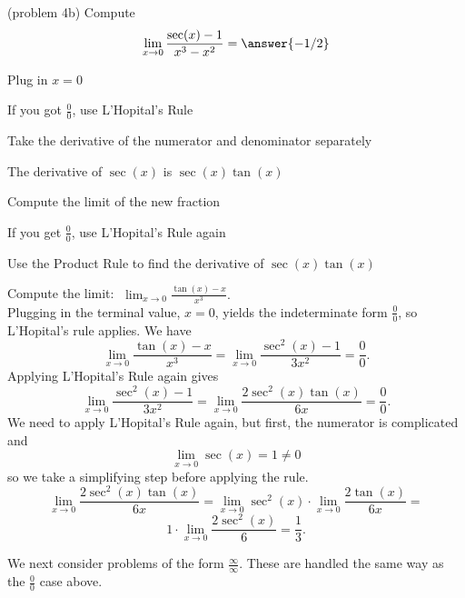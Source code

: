\documentclass[handout]{ximera}
\begin{document}
\begin{problem}(problem 4b)
  Compute
  \[
  \lim_{x \to 0} \frac{\sec(x) - 1}{x^3 - x^2} = \answer{-1/2}
  \]
  
    \begin{hint}
      Plug in $x=0$
    \end{hint}
    \begin{hint}
      If you got $\frac00$, use L'Hopital's Rule
    \end{hint}
    \begin{hint}
      Take the derivative of the numerator and denominator separately
    \end{hint}
		\begin{hint}
		  The derivative of $\sec(x)$ is $\sec(x)\tan(x)$
	  \end{hint}
		\begin{hint}
      Compute the limit of the new fraction
    \end{hint}
		\begin{hint}
		 If you get $\frac00$, use L'Hopital's Rule again
    \end{hint}
		\begin{hint}
		  Use the Product Rule to find the derivative of $\sec(x)\tan(x)$
		\end{hint}
		
\end{problem}


\begin{example}[example 5]
Compute the limit:  $\displaystyle{\;\lim_{x \to 0} \frac{\tan(x)-x}{x^3}}.$\\
Plugging in the terminal value, $x=0$, yields 
the indeterminate form $\frac00$, so L'Hopital's rule applies.
We have 
\[\lim_{x \to 0} \frac{\tan(x)-x}{x^3} = \lim_{x \to 0} \frac{\sec^2(x)-1}{3x^2} = \frac{0}{0}.\]
Applying L'Hopital's Rule again gives
\[\lim_{x \to 0} \frac{\sec^2(x)-1}{3x^2} = \lim_{x \to 0} \frac{2\sec^2(x)\tan(x)}{6x} = \frac{0}{0}.\]	
We need to apply L'Hopital's Rule again, but first, the numerator is complicated and 								
\[\lim_{x \to 0} \sec(x) = 1 \neq 0\]
so we take a simplifying step before applying the rule.
\[\lim_{x \to 0} \frac{2\sec^2(x)\tan(x)}{6x} = 
\lim_{x \to 0} \sec^2(x) \cdot \lim_{x \to 0} \frac{2\tan(x)}{6x}=\]
 \[1\cdot \lim_{x \to 0} \frac{2\sec^2(x)}{6} =\frac{1}{3}.\]
\end{example}


We next consider problems of the form $\frac{\infty}{\infty}$.  These are handled the same way as the $\frac00$ case above.
\end{document}
